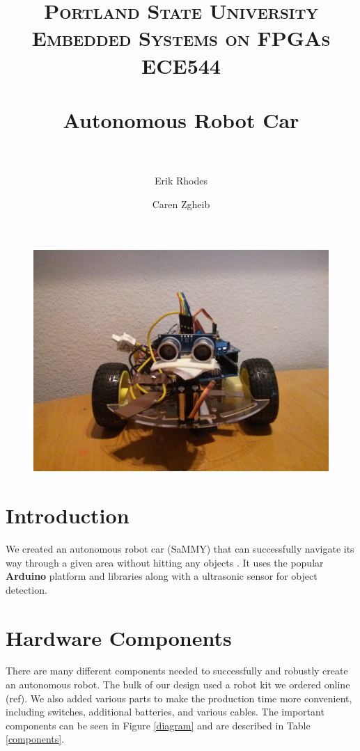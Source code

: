 \documentclass[11pt]{article}
\title{	
\normalfont \normalsize 
\textsc{\LARGE Portland State University}\\[1.5cm] %
\textsc{\Large Embedded Systems on FPGAs}\\[0.5cm] %
\textsc{\large ECE544}\\[0.5cm] %
\horrule{1.2pt} \\[0.4cm] %
\huge Autonomous Robot Car \\ %
\horrule{1.2pt} \\[0.5cm] %
}
\begin{document}
\raggedright
\author{Erik Rhodes \and Caren Zgheib} %
\maketitle %
\thispagestyle{empty}


\begin{figure}[h]\centering
\includegraphics[height=0.65\textwidth]{images/bot_front.jpg}
		\label{bot_front}
	\end{figure}
	
\tableofcontents
\newpage

\section{Introduction} 
We created an autonomous robot car (SaMMY) that can successfully navigate its way through a given area without hitting any objects . It uses the popular \textbf{Arduino} platform and libraries along with a ultrasonic sensor for object detection. 


\section{Hardware Components}
There are many different components needed to successfully and robustly create an autonomous robot.  The bulk of our design used a robot kit we ordered online (ref).  We also added various parts to make the production time more convenient, including switches, additional batteries, and various cables.  The important components can be seen in Figure \ref{diagram} and are described in Table \ref{components}.
\end{document}
